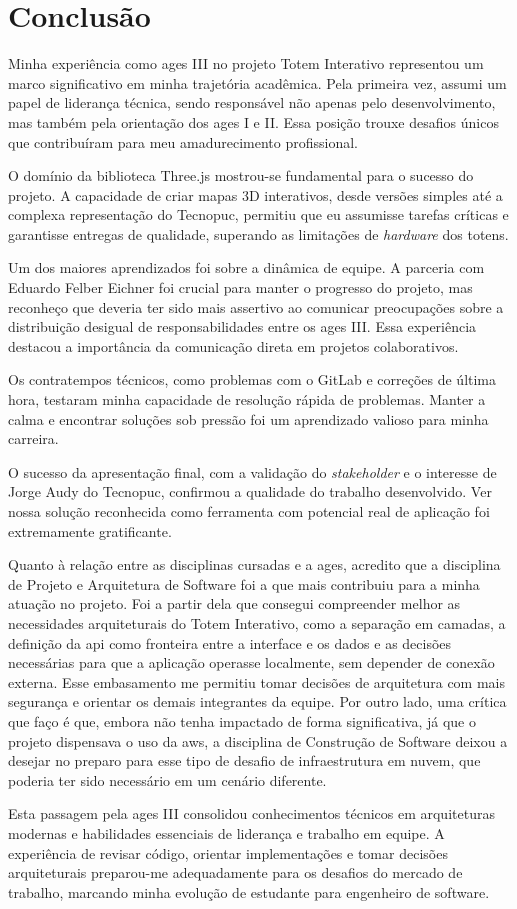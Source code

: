 \section[Conclusão]{Conclusão}

Minha experiência como \ac{ages} III no projeto Totem Interativo representou um marco significativo em minha trajetória acadêmica. Pela primeira vez, assumi um papel de liderança técnica, sendo responsável não apenas pelo desenvolvimento, mas também pela orientação dos \ac{ages} I e II. Essa posição trouxe desafios únicos que contribuíram para meu amadurecimento profissional.

O domínio da biblioteca Three.js mostrou-se fundamental para o sucesso do projeto. A capacidade de criar mapas 3D interativos, desde versões simples até a complexa representação do Tecnopuc, permitiu que eu assumisse tarefas críticas e garantisse entregas de qualidade, superando as limitações de \textit{hardware} dos totens.

Um dos maiores aprendizados foi sobre a dinâmica de equipe. A parceria com Eduardo Felber Eichner foi crucial para manter o progresso do projeto, mas reconheço que deveria ter sido mais assertivo ao comunicar preocupações sobre a distribuição desigual de responsabilidades entre os \ac{ages} III. Essa experiência destacou a importância da comunicação direta em projetos colaborativos.

Os contratempos técnicos, como problemas com o GitLab e correções de última hora, testaram minha capacidade de resolução rápida de problemas. Manter a calma e encontrar soluções sob pressão foi um aprendizado valioso para minha carreira.

O sucesso da apresentação final, com a validação do \textit{stakeholder} e o interesse de Jorge Audy do Tecnopuc, confirmou a qualidade do trabalho desenvolvido. Ver nossa solução reconhecida como ferramenta com potencial real de aplicação foi extremamente gratificante.

Quanto à relação entre as disciplinas cursadas e a \ac{ages}, acredito que a disciplina de Projeto e Arquitetura de Software foi a que mais contribuiu para a minha atuação no projeto. Foi a partir dela que consegui compreender melhor as necessidades arquiteturais do Totem Interativo, como a separação em camadas, a definição da \ac{api} como fronteira entre a interface e os dados e as decisões necessárias para que a aplicação operasse localmente, sem depender de conexão externa. Esse embasamento me permitiu tomar decisões de arquitetura com mais segurança e orientar os demais integrantes da equipe. Por outro lado, uma crítica que faço é que, embora não tenha impactado de forma significativa, já que o projeto dispensava o uso da \ac{aws}, a disciplina de Construção de Software deixou a desejar no preparo para esse tipo de desafio de infraestrutura em nuvem, que poderia ter sido necessário em um cenário diferente.

Esta passagem pela \ac{ages} III consolidou conhecimentos técnicos em arquiteturas modernas e habilidades essenciais de liderança e trabalho em equipe. A experiência de revisar código, orientar implementações e tomar decisões arquiteturais preparou-me adequadamente para os desafios do mercado de trabalho, marcando minha evolução de estudante para engenheiro de software.
